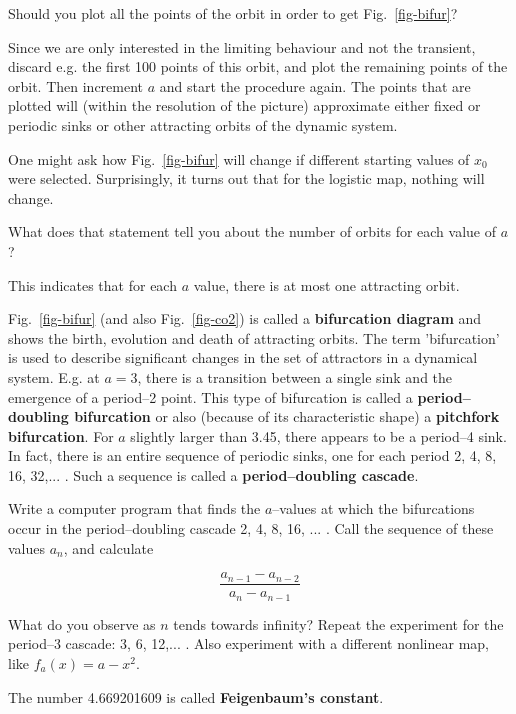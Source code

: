 \begin{cue}
Should you plot all the points of the orbit in order to get Fig.~\ref{fig-bifur}?  
\end{cue}

Since we are only interested in the limiting behaviour and not the transient, discard e.g. the first 100 points of this orbit, and plot the remaining points of the orbit. Then increment $a$ and start the procedure again. The points that are plotted will (within the resolution of the picture) approximate either fixed or periodic sinks or other attracting orbits of the dynamic system.

One might ask how Fig.~\ref{fig-bifur} will change if different starting values of $x_0$ were selected. Surprisingly, it turns out that for the logistic map, nothing will change.

\begin{cue}
What does that statement tell you about the number of orbits for each value of $a$?  
\end{cue}

This indicates that for each $a$ value, there is at most one attracting orbit.

Fig.~\ref{fig-bifur} (and also Fig.~\ref{fig-co2}) is called a \textbf{bifurcation diagram} and shows the birth, evolution and death of attracting orbits. The term 'bifurcation' is used to describe significant changes in the set of attractors in a dynamical system. E.g. at $a=3$, there is a transition between a single sink and the emergence of a period--2 point. This type of bifurcation is called a \textbf{period--doubling bifurcation} or also (because of its characteristic shape) a \textbf{pitchfork bifurcation}. For $a$ slightly larger than 3.45, there appears to be a period--4 sink. In fact, there is an entire sequence of periodic sinks, one for each period 2, 4, 8, 16, 32,... . Such a sequence is called a \textbf{period--doubling cascade}.


\begin{exer}
Write a computer program that finds the $a$--values at which the bifurcations occur in the period--doubling cascade 2, 4, 8, 16, ... . Call the sequence of these values $a_n$, and calculate

$$\frac{a_{n-1} - a_{n-2}}{a_{n} - a_{n-1}}$$

What do you observe as $n$ tends towards infinity? Repeat the experiment for the period--3 cascade: 3, 6, 12,... . Also experiment with a different nonlinear map, like $f_a(x)=a-x^2$.

The number 4.669201609 is called \textbf{Feigenbaum's constant}.
\end{exer}

